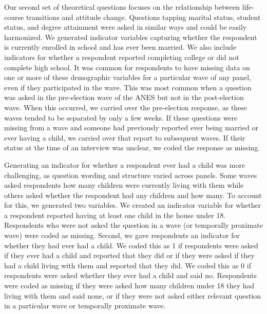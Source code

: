 \documentclass[
  12pt,
]{article}
\begin{document}
Our second set of theoretical questions focuses on the relationship between life-course transitions and attitude change. Questions tapping marital status, student status, and degree attainment were asked in similar ways and could be easily harmonized. We generated indicator variables capturing whether the respondent is currently enrolled in school and has ever been married. We also include indicators for whether a respondent reported completing college or did not complete high school. It was common for respondents to have missing data on one or more of these demographic variables for a particular wave of any panel, even if they participated in the wave. This was most common when a question was asked in the pre-election wave of the ANES but not in the post-election wave. When this occurred, we carried over the pre-election response, as these waves tended to be separated by only a few weeks. If these questions were missing from a wave and someone had previously reported ever being married or ever having a child, we carried over that report to subsequent waves. If their status at the time of an interview was unclear, we coded the response as missing.

Generating an indicator for whether a respondent ever had a child was more challenging, as question wording and structure varied across panels. Some waves asked respondents how many children were currently living with them while others asked whether the respondent had any children and how many. To account for this, we generated two variables. We created an indicator variable for whether a respondent reported having at least one child in the house under 18. Respondents who were not asked the question in a wave (or temporally proximate wave) were coded as missing. Second, we gave respondents an indicator for whether they had ever had a child. We coded this as 1 if respondents were asked if they ever had a child and reported that they did or if they were asked if they had a child living with them and reported that they did. We coded this as 0 if respondents were asked whether they ever had a child and said no. Respondents were coded as missing if they were asked how many children under 18 they had living with them and said none, or if they were not asked either relevant question in a particular wave or temporally proximate wave.
\end{document}
